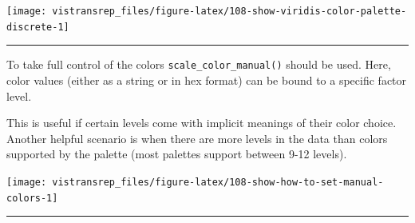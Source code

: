 \documentclass[]{book}
\newenvironment{Shaded}{}{}
\newcommand{\DataTypeTok}[1]{#1}
\newcommand{\KeywordTok}[1]{\textcolor[rgb]{0.00,0.00,1.00}{#1}}
\newcommand{\NormalTok}[1]{#1}
\newcommand{\OperatorTok}[1]{#1}
\newcommand{\StringTok}[1]{\textcolor[rgb]{0.00,0.50,0.50}{#1}}
\begin{document}
\begin{flushright}\texttt{[image: vistransrep\_files/figure-latex/108-show-viridis-color-palette-discrete-1]} \end{flushright}

\begin{center}\rule{0.5\linewidth}{\linethickness}\end{center}

To take full control of the colors \texttt{scale\_color\_manual()} should be used.
Here, color values (either as a string or in hex format) can be bound to a specific factor level.

This is useful if certain levels come with implicit meanings of their color choice.
Another helpful scenario is when there are more levels in the data than colors supported by the palette (most palettes support between 9-12 levels).

\begin{Shaded}
\end{Shaded}

\begin{flushright}\texttt{[image: vistransrep\_files/figure-latex/108-show-how-to-set-manual-colors-1]} \end{flushright}

\begin{center}\rule{0.5\linewidth}{\linethickness}\end{center}
\end{document}
